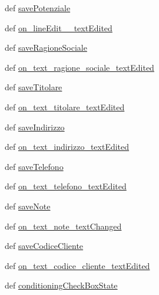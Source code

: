\begin{DoxyCompactItemize}
\item 
def \hyperlink{classmmasgis_1_1anagrafica_1_1MainWindowAnagrafica_ae3a7f909a1870204e63b63d2d63dd8bd}{savePotenziale}
\item 
def \hyperlink{classmmasgis_1_1anagrafica_1_1MainWindowAnagrafica_aa37f0df30ba332a192fe6e169026368d}{on\_\-lineEdit\_\_\-textEdited}
\item 
def \hyperlink{classmmasgis_1_1anagrafica_1_1MainWindowAnagrafica_ad948ca40d90268a9a3df4dbab26fdb82}{saveRagioneSociale}
\item 
def \hyperlink{classmmasgis_1_1anagrafica_1_1MainWindowAnagrafica_a63d93a5218f521e2921e90622d63fb11}{on\_\-text\_\-ragione\_\-sociale\_\-textEdited}
\item 
def \hyperlink{classmmasgis_1_1anagrafica_1_1MainWindowAnagrafica_a2bc6331cab4ee035eafde3f1a9128cfe}{saveTitolare}
\item 
def \hyperlink{classmmasgis_1_1anagrafica_1_1MainWindowAnagrafica_aaa9c9cd9d0dd4a622de0295582b1e0c0}{on\_\-text\_\-titolare\_\-textEdited}
\item 
def \hyperlink{classmmasgis_1_1anagrafica_1_1MainWindowAnagrafica_aff8f29ba1771af87d1e12c2189ae6e91}{saveIndirizzo}
\item 
def \hyperlink{classmmasgis_1_1anagrafica_1_1MainWindowAnagrafica_ad8f4451bfa6e8478b9c9ba5b46ff0a6e}{on\_\-text\_\-indirizzo\_\-textEdited}
\item 
def \hyperlink{classmmasgis_1_1anagrafica_1_1MainWindowAnagrafica_a9156fa3def48161fae1a033fac0ab4b1}{saveTelefono}
\item 
def \hyperlink{classmmasgis_1_1anagrafica_1_1MainWindowAnagrafica_a55e89b33b2f309912c35ec9b0465da3d}{on\_\-text\_\-telefono\_\-textEdited}
\item 
def \hyperlink{classmmasgis_1_1anagrafica_1_1MainWindowAnagrafica_acf2f15a7c9ba7666bed86fe03c3719a7}{saveNote}
\item 
def \hyperlink{classmmasgis_1_1anagrafica_1_1MainWindowAnagrafica_ad13eae623e2c2537310f8e41b8ab1480}{on\_\-text\_\-note\_\-textChanged}
\item 
def \hyperlink{classmmasgis_1_1anagrafica_1_1MainWindowAnagrafica_a3515656b2f777acaff778f9ed1e7dfb8}{saveCodiceCliente}
\item 
def \hyperlink{classmmasgis_1_1anagrafica_1_1MainWindowAnagrafica_a1257ca2b678998fd1bce4d31d1084354}{on\_\-text\_\-codice\_\-cliente\_\-textEdited}
\item 
def \hyperlink{classmmasgis_1_1anagrafica_1_1MainWindowAnagrafica_a4238ea24c2d2d280bbf3d8bc69b155df}{conditioningCheckBoxState}

\end{DoxyCompactItemize}
